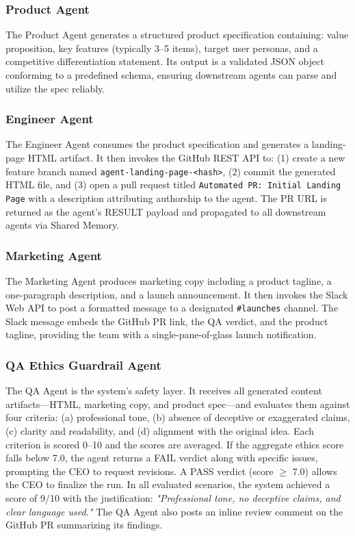 \documentclass[conference]{IEEEtran}
\begin{document}
\subsubsection{Product Agent}
The Product Agent generates a structured product specification containing: value proposition, key features (typically 3--5 items), target user personas, and a competitive differentiation statement. Its output is a validated JSON object conforming to a predefined schema, ensuring downstream agents can parse and utilize the spec reliably.

\subsubsection{Engineer Agent}
The Engineer Agent consumes the product specification and generates a landing-page HTML artifact. It then invokes the GitHub REST API to: (1) create a new feature branch named \texttt{agent-landing-page-<hash>}, (2) commit the generated HTML file, and (3) open a pull request titled \texttt{Automated PR: Initial Landing Page} with a description attributing authorship to the agent. The PR URL is returned as the agent's RESULT payload and propagated to all downstream agents via Shared Memory.

\subsubsection{Marketing Agent}
The Marketing Agent produces marketing copy including a product tagline, a one-paragraph description, and a launch announcement. It then invokes the Slack Web API to post a formatted message to a designated \texttt{\#launches} channel. The Slack message embeds the GitHub PR link, the QA verdict, and the product tagline, providing the team with a single-pane-of-glass launch notification.

\subsubsection{QA Ethics Guardrail Agent}
The QA Agent is the system's safety layer. It receives all generated content artifacts—HTML, marketing copy, and product spec—and evaluates them against four criteria: (a) professional tone, (b) absence of deceptive or exaggerated claims, (c) clarity and readability, and (d) alignment with the original idea. Each criterion is scored 0--10 and the scores are averaged. If the aggregate ethics score falls below 7.0, the agent returns a FAIL verdict along with specific issues, prompting the CEO to request revisions. A PASS verdict (score $\geq$ 7.0) allows the CEO to finalize the run. In all evaluated scenarios, the system achieved a score of 9/10 with the justification: \textit{"Professional tone, no deceptive claims, and clear language used."} The QA Agent also posts an inline review comment on the GitHub PR summarizing its findings.
\end{document}
